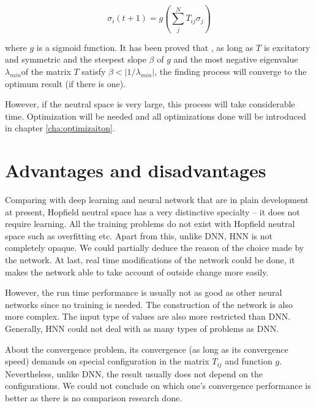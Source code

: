 \[ \sigma_i(t+1)=g(\sum_{j}^{N}{T_{ij}\sigma_j}) \]

where $ g $ is a sigmoid function. 
It has been proved that \cite{RN11}, as long as $T$ is excitatory and symmetric and the steepest slope $\beta $ of $g$ and the most negative eigenvalue $\lambda_{min}$of the matrix $T$ satisfy $ \beta < |1/\lambda_{min}|$,
the finding process will converge to the optimum result (if there is one).

However, if the neutral space is very large, this process will take considerable time. Optimization will be needed and all optimizations done will be introduced in chapter \ref{cha:optimizaiton}.



\section{Advantages and disadvantages}
\label{sec:hopfield_advanddisadv}
Comparing with deep learning and neural network that are in plain development at present,
Hopfield neutral space has a very distinctive specialty – it does not require learning.
All the training problems do not exist with Hopfield neutral space such as overfitting etc.
Apart from this, unlike DNN, HNN is not completely opaque. 
We could partially deduce the reason of the choice made by the network.
At last, real time modifications of the network could be done, it makes the network able to take account of outside change more easily.

However, the run time performance is usually not as good as other neural networks since no training is needed.
The construction of the network is also more complex. The input type of values are also more restricted than DNN. 
Generally, HNN could not deal with as many types of problems as DNN.

About the convergence problem, its convergence (as long as its convergence speed) demands on special configuration in the matrix $ T_{ij} $ and function $g$. 
Nevertheless, unlike DNN, the result usually does not depend on the configurations. 
We could not conclude on which one's convergence performance is better as there is no comparison research done. 




